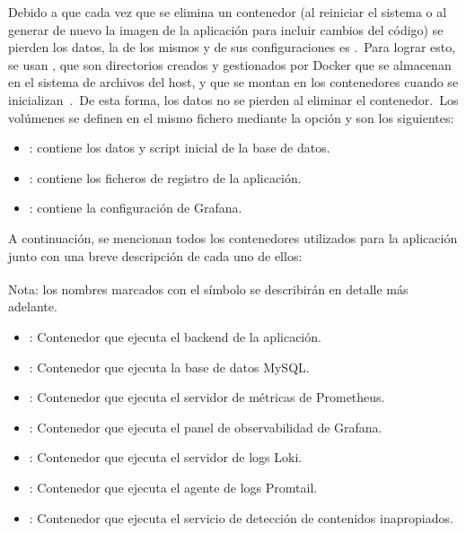 Debido a que cada vez que se elimina un contenedor (al reiniciar el sistema o al generar de nuevo la imagen de la
aplicación para incluir cambios del código) se pierden los datos, la  de los mismos y de sus
configuraciones es .\ Para lograr esto, se usan , que son directorios creados y
gestionados por Docker que se almacenan en el sistema de archivos del host, y que se montan en los contenedores cuando
se inicializan~\cite{docker-volumes}.\ De esta forma, los datos no se pierden al eliminar el contenedor.\ Los
volúmenes se definen en el mismo fichero  mediante la opción  y son
los siguientes:

\begin{itemize}
	\item {}: contiene los datos y script inicial de la base de datos.
	\item {}: contiene los ficheros de registro de la aplicación.
	\item {}: contiene la configuración de Grafana.
\end{itemize}

A continuación, se mencionan todos los contenedores utilizados para la aplicación junto con una breve descripción de
cada uno de ellos:

	{\footnotesize Nota: los nombres marcados con el símbolo \textsuperscript{\textasteriskcentered} se describirán en
detalle más adelante.}

\begin{itemize}
	\item {}: Contenedor que ejecuta el backend de la aplicación.
	\item {}: Contenedor que ejecuta la base de datos MySQL\@.
	\item {}: Contenedor que ejecuta el servidor de métricas
	de Prometheus.
	\item {}: Contenedor que ejecuta el panel de observabilidad
	de Grafana.
	\item {}: Contenedor que ejecuta el servidor de logs Loki.
	\item {}: Contenedor que ejecuta el agente de logs
	Promtail.
	\item {}: Contenedor que ejecuta el servicio de detección de
	contenidos inapropiados\@.
\end{itemize}
\label{itm:docker-compose-services}


